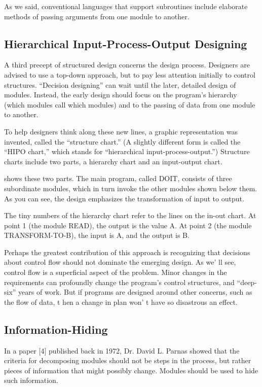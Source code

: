 As we said, conventional languages that support subroutines include
elaborate methods of passing arguments from one module to another.


\subsection{Hierarchical Input-Process-Output Designing}
A third precept of structured design concerns the design process.
Designers are advised to use a top-down approach, but to pay less
attention initially to control structures. {}``Decision designing''
can wait until the later, detailed design of modules. Instead, the
early design should focus on the program's hierarchy (which modules
call which modules) and to the passing of data from one module to
another.

To help designers think along these new lines, a graphic representation
was invented, called the {}``structure chart.'' (A slightly different
form is called the {}``HIPO chart,'' which stands for {}``hierarchical
input-process-output.'') Structure charts include two parts, a hierarchy
chart and an input-output chart.


 shows these two parts. The main program, called DOIT,
consists of three subordinate modules, which in turn invoke the other
modules shown below them. As you can see, the design emphasizes the
transformation of input to output. 

The tiny numbers of the hierarchy chart refer to the lines on the in-out
chart. At point 1 (the module READ), the output is the value A. At
point 2 (the module TRANSFORM-TO-B), the input is A, and the output
is B. 

Perhaps the greatest contribution of this approach is recognizing
that decisions about control flow should not dominate the emerging
design. As we' ll see, control flow is a superficial aspect of the
problem. Minor changes in the requirements can profoundly change the
program's control structures, and {}``deep-six'' years of work.
But if programs are designed around other concerns, such as the flow
of data, t hen a change in plan won' t have so disastrous an effect.


\subsection{Information-Hiding }
In a paper {[}4{]} published back in 1972, Dr. David L. Parnas showed
that the criteria for decomposing modules should not be steps in the
process, but rather pieces of information that might possibly change.
Modules should be used to hide such information.

